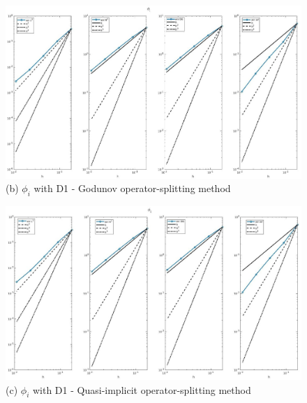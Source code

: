 \documentclass[a4paper,11pt]{article}
\begin{document}
\begin{figure}[h]
\begin{center}
\includegraphics[width =\textwidth]{./D1_Phii_1_GO.jpg}
\caption*{(b) $\phi_i$ with D1 - Godunov operator-splitting method}
\end{center}
\end{figure}
\begin{figure}[H]
\begin{center}
\includegraphics[width =\textwidth]{./D1_Phii_1_OS.jpg}
\caption*{(c) $\phi_i$ with D1 - Quasi-implicit operator-splitting method}
\end{center}
\end{figure}
\newpage
\end{document}
